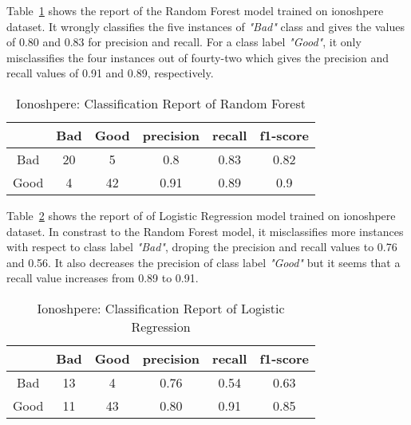 \documentclass[english]{tktltiki2}
\theoremstyle{definition}
\theoremstyle{remark}
\begin{document}
Table~\ref{table:rf_model_iono_report} shows the report of the Random Forest model trained on ionoshpere dataset. It wrongly classifies the five instances of \textit{"Bad"} class and gives the values of 0.80 and 0.83 for precision and recall. For a class label \textit{"Good"}, it only misclassifies the four instances out of fourty-two which gives the precision and recall values of 0.91 and 0.89, respectively.

\begin{table}[H]
	\begin{center}
		\caption{Ionoshpere: Classification Report of Random Forest}
		\label{table:rf_model_iono_report}
		\begin{tabular}{@{}cccccc@{}}
			\toprule
			& Bad & Good & precision & recall & f1-score \\ \hline
			\multicolumn{1}{|c|}{Bad} & \multicolumn{1}{c|}{20} & \multicolumn{1}{c|}{5} & \multicolumn{1}{c|}{0.8} & \multicolumn{1}{c|}{0.83} & \multicolumn{1}{c|}{0.82} \\ \hline
			\multicolumn{1}{|c|}{Good} & \multicolumn{1}{c|}{4} & \multicolumn{1}{c|}{42} & \multicolumn{1}{c|}{0.91} & \multicolumn{1}{c|}{0.89} & \multicolumn{1}{c|}{0.9} \\ \hline
		\end{tabular}
	\end{center}
\end{table}

Table~\ref{table:lr_model_iono_report} shows the report of of Logistic Regression model trained on ionoshpere dataset. In constrast to the Random Forest model, it misclassifies more instances with respect to class label \textit{"Bad"}, droping the precision and recall values to 0.76 and 0.56. It also decreases the precision of class label \textit{"Good"} but it seems that a recall value increases from 0.89 to 0.91.

\begin{table}[H]
	\begin{center}
		\caption{Ionoshpere: Classification Report of Logistic Regression}
		\label{table:lr_model_iono_report}
		\begin{tabular}{@{}cccccc@{}}
			\toprule
			& Bad & Good & precision & recall & f1-score \\ \hline
			\multicolumn{1}{|c|}{Bad} & \multicolumn{1}{c|}{13} & \multicolumn{1}{c|}{4} & \multicolumn{1}{c|}{0.76} & \multicolumn{1}{c|}{0.54} & \multicolumn{1}{c|}{0.63} \\ \hline
			\multicolumn{1}{|c|}{Good} & \multicolumn{1}{c|}{11} & \multicolumn{1}{c|}{43} & \multicolumn{1}{c|}{0.80} & \multicolumn{1}{c|}{0.91} & \multicolumn{1}{c|}{0.85} \\ \hline
		\end{tabular}
	\end{center}
\end{table}
\end{document}

